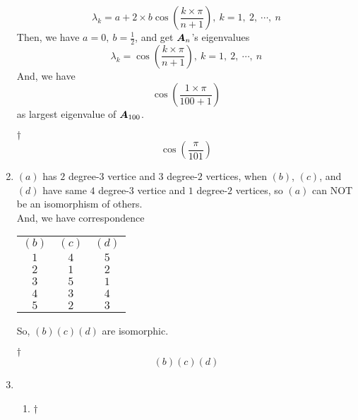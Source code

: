 \documentclass[a4paper,12pt]{article}
\begin{document}
\begin{enumerate}
\begin{equation}
        \lambda_k = a + 2 \times b \cos(\frac{k \times \pi}{n + 1}), \ k = 1, \ 2, \ \cdots, \ n
    \end{equation} Then, we have $a = 0, \ b = \frac{1}{2}$, and get $\boldsymbol{A}_n$'s eigenvalues \begin{equation}
        \lambda_k = \cos(\frac{k \times \pi}{n + 1}), \ k = 1, \ 2, \ \cdots, \ n
    \end{equation} And, we have \begin{equation}
        \cos(\frac{1 \times \pi}{100 + 1})
    \end{equation} as largest eigenvalue of $\boldsymbol{A}_{100}$.
    \begin{answer}{$\dag$}\begin{equation}
            \cos(\frac{\pi}{101})
        \end{equation}
    \end{answer}
    \item $(a)$ has $2$ degree-$3$ vertice and $3$ degree-$2$ vertices, when $(b)$, $(c)$, and $(d)$ have same $4$ degree-$3$ vertice and $1$ degree-$2$ vertices, so $(a)$ can NOT be an isomorphism of others. \\
    And, we have correspondence \begin{table}[H]
        \centering
        \begin{tabular}{|c|c|c|}
            \hline
            $(b)$ & $(c)$ & $(d)$ \\
            \Xhline{2\arrayrulewidth}
            $1$ & $4$ & $5$ \\
            \hline
            $2$ & $1$ & $2$ \\
            \hline
            $3$ & $5$ & $1$ \\
            \hline
            $4$ & $3$ & $4$ \\
            \hline
            $5$ & $2$ & $3$ \\
            \hline
        \end{tabular}
    \end{table} So, $(b)(c)(d)$ are isomorphic.
    \begin{answer}{$\dag$}\begin{equation}
            (b)(c)(d)
        \end{equation}
    \end{answer}
    \item \begin{enumerate}[label=(\alph*)]
        \item \begin{answer}{$\dag$}\begin{equation}

\end{equation}
\end{answer}
\end{enumerate}
\end{enumerate}
\end{document}
